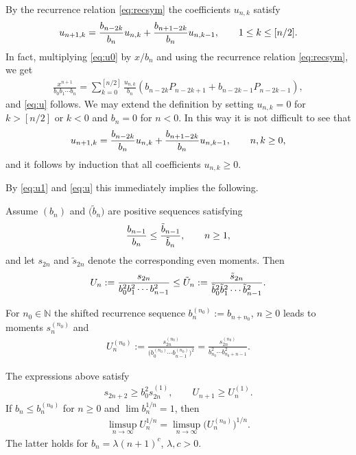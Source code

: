 By the recurrence relation \eqref{eq:recsym} the coefficients $u_{n,k}$ satisfy
\begin{gather}\label{eq:u}
u_{n+1,k}={b_{n-2k}\over b_n} u_{n,k}+{b_{n+1-2k}\over b_n}u_{n,k-1},\qquad 1\le k\le [n/2].
\end{gather}
In fact, multiplying \eqref{eq:u0} by $x/b_n$ and using the recurrence relation \eqref{eq:recsym}, we get
\begin{gather*}
\frac{x^{n+1}}{b_0b_1\cdots b_n}=\sum_{k=0}^{[n/2]}\frac{u_{n,k}}{b_n}\left(b_{n-2k}P_{n-2k+1}+b_{n-2k-1}P_{n-2k-1}\right),
\end{gather*}
and \eqref{eq:u} follows. We may extend the definition by setting $u_{n,k}=0$ for $k>[n/2]$ or $k<0$ and $b_n=0$ for $n<0$. In this way it is not difficult to see that
 \begin{gather}\label{eq:u'}
u_{n+1,k}={b_{n-2k}\over b_n} u_{n,k}+{b_{n+1-2k}\over b_n}u_{n,k-1},\qquad n, k\ge 0,
\end{gather}
and it follows by induction that all coefficients $u_{n,k}\ge 0$.

By \eqref{eq:u1} and \eqref{eq:u} this immediately implies the following.

\begin{prop}\label{thm:comparison} Assume $(b_n)$ and $\big(\tilde{b}_n\big)$ are positive sequences satisfying
\begin{gather*}
{b_{n-1}\over b_{n}} \le {\tilde{b}_{n-1}\over \tilde{b}_{n}} ,\qquad n\ge 1,
\end{gather*}
 and let $s_{2n}$ and $\tilde{s}_{2n}$ denote the corresponding even moments. Then
\begin{gather*}
 U_n:={s_{2n}\over b_0^2b_1^2\cdots b_{n-1}^2} \le \tilde{U}_n:={\tilde{s}_{2n}\over \tilde{b}_0^2\tilde{b}_1^2\cdots \tilde{b}_{n-1}^2}.
\end{gather*}
\end{prop}

For $n_0\in\mathbb N$ the shifted recurrence sequence $b_n^{(n_0)}:=b_{n+n_0}$, $n\ge 0$ leads to moments $s_n^{(n_0)}$ and
\begin{gather*}
U_n^{(n_0)}:=\frac{s_{2n}^{(n_0)}}{\big(b_0^{(n_0)}\cdots b_{n-1}^{(n_0)}\big)^2}=\frac{s_{2n}^{(n_0)}}{b_{n_0}^2\cdots b_{n_0+n-1}^2}.
\end{gather*}

\begin{prop}\label{thm:shiftU} The expressions above satisfy
\begin{gather}\label{eq:shiftU1}
s_{2n+2}\ge b_0^2 s_{2n}^{(1)},\qquad U_{n+1}\ge U_n^{(1)}.
\end{gather}
If $b_n\le b_n^{(n_0)}$ for $n\ge 0$ and $\lim b_n^{1/n}=1$, then
\begin{gather}\label{eq:shiftU2}
\limsup_{n\to\infty} U_n^{1/n}=\limsup_{n\to\infty}\big(U_n^{(n_0)}\big)^{1/n}.
\end{gather}
The latter holds for $b_n=\lambda (n+1)^c$, $\lambda, c>0$.
\end{prop}

